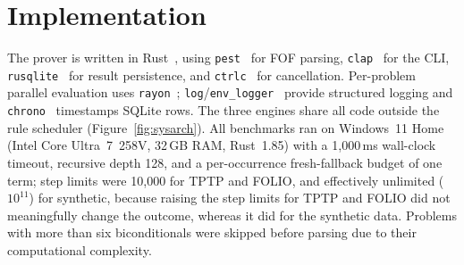 \section{Implementation}\label{sec:impl}

The prover is written in Rust~\cite{rust2024},
using \texttt{pest}~\cite{pest2024} for FOF parsing,
\texttt{clap}~\cite{clap2024} for the CLI,
\texttt{rusqlite}~\cite{rusqlite2024} for result persistence, and
\texttt{ctrlc}~\cite{ctrlc2024} for cancellation. Per-problem parallel
evaluation uses \texttt{rayon}~\cite{rayon2024};
\texttt{log}/\texttt{env\_logger}~\cite{log2024,envlogger2024} provide
structured logging and \texttt{chrono}~\cite{chrono2024} timestamps
SQLite rows. The three engines share all code outside the rule scheduler
(Figure~\ref{fig:sysarch}). All benchmarks ran on Windows~11 Home (Intel
Core Ultra~7~258V, 32\,GB RAM, Rust~1.85) with a 1{,}000\,ms wall-clock
timeout, recursive depth 128, and a per-occurrence fresh-fallback budget of one
term; step limits were 10{,}000 for TPTP and FOLIO, and effectively
unlimited ($10^{11}$) for synthetic, because raising the step
limits for TPTP and FOLIO did not meaningfully change the outcome,
whereas it did for the synthetic data.
Problems with more than six
biconditionals were skipped before parsing due to their computational
complexity.
